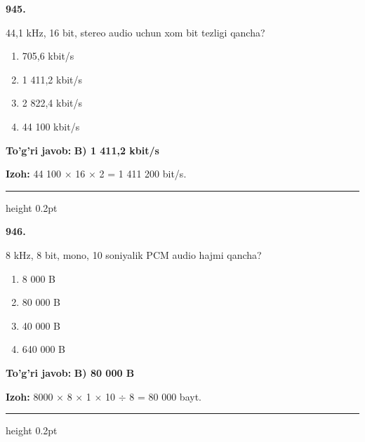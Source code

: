 \documentclass[10pt,a4paper,oneside]{article}
\begin{document}
\noindent\textbf{\color{ink}945.}
\par
44,1 kHz, 16 bit, stereo audio uchun xom bit tezligi qancha?
\begin{enumerate}[label=\Alph*),leftmargin=9mm]
\item 705,6 kbit/s
\item 1 411,2 kbit/s
\item 2 822,4 kbit/s
\item 44 100 kbit/s
\end{enumerate}
\begin{tcolorbox}[enhanced,breakable,colback=teal!4,colframe=teal!50!black,boxrule=0.5pt,arc=1.1mm,left=3mm,right=3mm,top=1.7mm,bottom=1.7mm,before skip=2mm,after skip=2mm]
\textbf{\color{teal}To'g'ri javob:} \textbf{B) 1 411,2 kbit/s}
\par\smallskip
\textbf{Izoh:} 44 100 \ensuremath{\times} 16 \ensuremath{\times} 2 = 1 411 200 bit/s.
\end{tcolorbox}
\vspace{2mm}\hrule height 0.2pt \vspace{3mm}

\noindent\textbf{\color{ink}946.}
\par
8 kHz, 8 bit, mono, 10 soniyalik PCM audio hajmi qancha?
\begin{enumerate}[label=\Alph*),leftmargin=9mm]
\item 8 000 B
\item 80 000 B
\item 40 000 B
\item 640 000 B
\end{enumerate}
\begin{tcolorbox}[enhanced,breakable,colback=teal!4,colframe=teal!50!black,boxrule=0.5pt,arc=1.1mm,left=3mm,right=3mm,top=1.7mm,bottom=1.7mm,before skip=2mm,after skip=2mm]
\textbf{\color{teal}To'g'ri javob:} \textbf{B) 80 000 B}
\par\smallskip
\textbf{Izoh:} 8000 \ensuremath{\times} 8 \ensuremath{\times} 1 \ensuremath{\times} 10 \ensuremath{\div} 8 = 80 000 bayt.
\end{tcolorbox}
\vspace{2mm}\hrule height 0.2pt \vspace{3mm}
\end{document}
